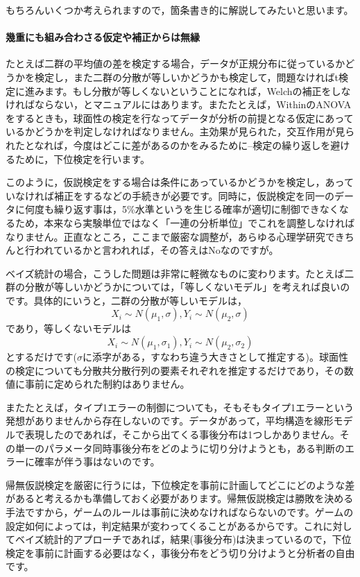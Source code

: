 \documentclass{ltjsbook}
\begin{document}
もちろんいくつか考えられますので，箇条書き的に解説してみたいと思います。

\paragraph{幾重にも組み合わさる仮定や補正からは無縁} たとえば二群の平均値の差を検定する場合，データが正規分布に従っているかどうかを検定し，また二群の分散が等しいかどうかも検定して，問題なければt検定に進みます。もし分散が等しくないということになれば，Welchの補正をしなければならない，とマニュアルにはあります。またたとえば，WithinのANOVAをするときも，球面性の検定を行なってデータが分析の前提となる仮定にあっているかどうかを判定しなければなりません。主効果が見られた，交互作用が見られたとなれば，今度はどこに差があるのかをみるために--検定の繰り返しを避けるために，下位検定を行います。

このように，仮説検定をする場合は条件にあっているかどうかを検定し，あっていなければ補正をするなどの手続きが必要です。同時に，仮説検定を同一のデータに何度も繰り返す事は，5\%水準というを生じる確率が適切に制御できなくなるため，本来なら実験単位ではなく「一連の分析単位」でこれを調整しなければなりません。正直なところ，ここまで厳密な調整が，あらゆる心理学研究できちんと行われているかと言われれば，その答えはNoなのですが。

ベイズ統計の場合，こうした問題は非常に軽微なものに変わります。たとえば二群の分散が等しいかどうかについては，「等しくないモデル」を考えれば良いのです。具体的にいうと，二群の分散が等しいモデルは，
$$ X_i \sim N(\mu_1,\sigma), Y_i \sim N(\mu_2,\sigma)$$
であり，等しくないモデルは
$$ X_i \sim N(\mu_1,\sigma_1), Y_i \sim N(\mu_2,\sigma_2)$$
とするだけです($\sigma$に添字がある，すなわち違う大きさとして推定する)。球面性の検定についても分散共分散行列の要素それぞれを推定するだけであり，その数値に事前に定められた制約はありません。

またたとえば，タイプ1エラーの制御についても，そもそもタイプ1エラーという発想がありませんから存在しないのです。データがあって，平均構造を線形モデルで表現したのであれば，そこから出てくる事後分布は1つしかありません。その単一のパラメータ同時事後分布をどのように切り分けようとも，ある判断のエラーに確率が伴う事はないのです。

帰無仮説検定を厳密に行うには，下位検定を事前に計画してどこにどのような差があると考えるかも準備しておく必要があります。帰無仮説検定は勝敗を決める手法ですから，ゲームのルールは事前に決めなければならないのです。ゲームの設定如何によっては，判定結果が変わってくることがあるからです。これに対してベイズ統計的アプローチであれば，結果(事後分布)は決まっているので，下位検定を事前に計画する必要はなく，事後分布をどう切り分けようと分析者の自由です。
\end{document}
